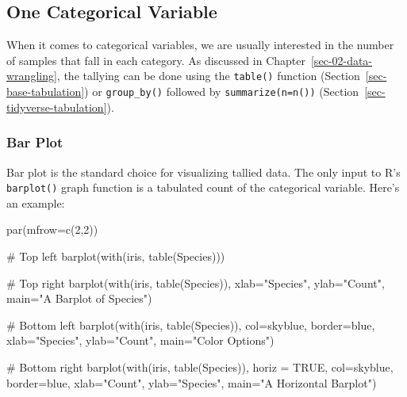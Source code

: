 \documentclass[
  letterpaper,
  DIV=11,
  numbers=noendperiod]{scrreprt}
\newenvironment{Shaded}{\begin{snugshade}}{\end{snugshade}}
\newcommand{\AttributeTok}[1]{\textcolor[rgb]{0.40,0.45,0.13}{#1}}
\newcommand{\CommentTok}[1]{\textcolor[rgb]{0.37,0.37,0.37}{#1}}
\newcommand{\ConstantTok}[1]{\textcolor[rgb]{0.56,0.35,0.01}{#1}}
\newcommand{\DecValTok}[1]{\textcolor[rgb]{0.68,0.00,0.00}{#1}}
\newcommand{\FunctionTok}[1]{\textcolor[rgb]{0.28,0.35,0.67}{#1}}
\newcommand{\NormalTok}[1]{\textcolor[rgb]{0.00,0.23,0.31}{#1}}
\newcommand{\StringTok}[1]{\textcolor[rgb]{0.13,0.47,0.30}{#1}}
\begin{document}
\subsection{One Categorical Variable}\label{one-categorical-variable}

When it comes to categorical variables, we are usually interested in the
number of samples that fall in each category. As discussed in
Chapter~\ref{sec-02-data-wrangling}, the tallying can be done using the
\texttt{table()} function (Section~\ref{sec-base-tabulation}) or
\texttt{group\_by()} followed by \texttt{summarize(n=n())}
(Section~\ref{sec-tidyverse-tabulation}).

\subsubsection{Bar Plot}\label{bar-plot}

Bar plot is the standard choice for visualizing tallied data. The only
input to R's \texttt{barplot()} graph function is a tabulated count of
the categorical variable. Here's an example:

\begin{Shaded}
\begin{Highlighting}[]
\FunctionTok{par}\NormalTok{(}\AttributeTok{mfrow=}\FunctionTok{c}\NormalTok{(}\DecValTok{2}\NormalTok{,}\DecValTok{2}\NormalTok{))}

\CommentTok{\# Top left}
\FunctionTok{barplot}\NormalTok{(}\FunctionTok{with}\NormalTok{(iris, }\FunctionTok{table}\NormalTok{(Species)))}

\CommentTok{\# Top right}
\FunctionTok{barplot}\NormalTok{(}\FunctionTok{with}\NormalTok{(iris, }\FunctionTok{table}\NormalTok{(Species)), }
        \AttributeTok{xlab=}\StringTok{"Species"}\NormalTok{, }
        \AttributeTok{ylab=}\StringTok{"Count"}\NormalTok{, }
        \AttributeTok{main=}\StringTok{"A Barplot of Species"}\NormalTok{)}

\CommentTok{\# Bottom left}
\FunctionTok{barplot}\NormalTok{(}\FunctionTok{with}\NormalTok{(iris, }\FunctionTok{table}\NormalTok{(Species)), }
        \AttributeTok{col=}\StringTok{\textquotesingle{}skyblue\textquotesingle{}}\NormalTok{, }
        \AttributeTok{border=}\StringTok{\textquotesingle{}blue\textquotesingle{}}\NormalTok{, }
        \AttributeTok{xlab=}\StringTok{"Species"}\NormalTok{, }
        \AttributeTok{ylab=}\StringTok{"Count"}\NormalTok{, }
        \AttributeTok{main=}\StringTok{"Color Options"}\NormalTok{)}

\CommentTok{\# Bottom right}
\FunctionTok{barplot}\NormalTok{(}\FunctionTok{with}\NormalTok{(iris, }\FunctionTok{table}\NormalTok{(Species)), }
        \AttributeTok{horiz =} \ConstantTok{TRUE}\NormalTok{, }
        \AttributeTok{col=}\StringTok{\textquotesingle{}skyblue\textquotesingle{}}\NormalTok{, }
        \AttributeTok{border=}\StringTok{\textquotesingle{}blue\textquotesingle{}}\NormalTok{, }
        \AttributeTok{xlab=}\StringTok{"Count"}\NormalTok{, }
        \AttributeTok{ylab=}\StringTok{"Species"}\NormalTok{, }
        \AttributeTok{main=}\StringTok{"A Horizontal Barplot"}\NormalTok{)}
\end{Highlighting}
\end{Shaded}
\end{document}
